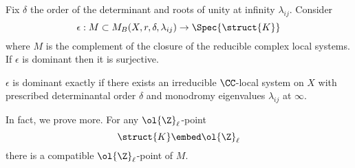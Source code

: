 \documentclass{article}
\begin{document}
\begin{theorem}
Fix $\delta$ the order of the determinant and roots of unity at infinity $\lambda_{ij}$. Consider
\[ \epsilon : M \subset M_B(X, r, \delta, \lambda_{ij}) \to \Spec{\struct{K}} \]
where $M$ is the complement of the closure of the reducible complex local systems. If $\epsilon$ is dominant then it is surjective. 
\end{theorem}

\begin{rmk}
$\epsilon$ is dominant exactly if there exists an irreducible $\CC$-local system on $X$ with prescribed determinantal order $\delta$ and monodromy eigenvalues $\lambda_{ij}$ at $\infty$.
\end{rmk}

\begin{rmk}
In fact, we prove more. For any $\ol{\Z}_\ell$-point
\[ \struct{K} \embed \ol{\Z}_\ell \]
there is a compatible $\ol{\Z}_{\ell}$-point of $M$.
\end{rmk}
\end{document}
